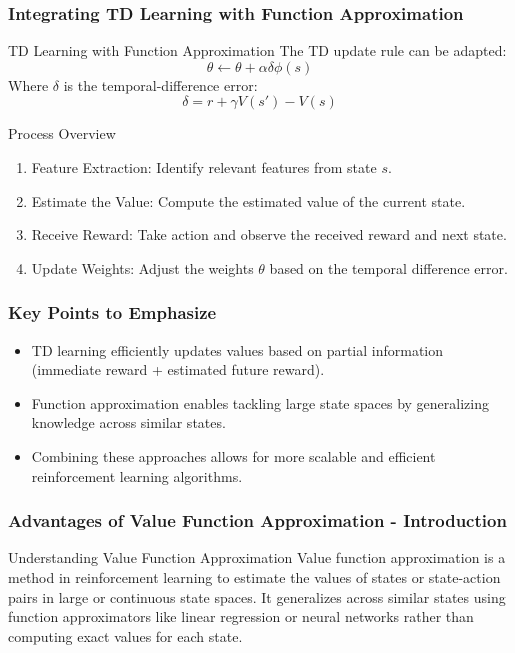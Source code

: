 \documentclass[aspectratio=169]{beamer}
\begin{document}
\begin{frame}[fragile]
    \frametitle{Integrating TD Learning with Function Approximation}
    
    \begin{block}{TD Learning with Function Approximation}
        The TD update rule can be adapted:
        \begin{equation}
            \theta \leftarrow \theta + \alpha \delta \phi(s)
        \end{equation}
        Where $\delta$ is the temporal-difference error:
        \begin{equation}
            \delta = r + \gamma V(s') - V(s)
        \end{equation}
    \end{block}
    
    \begin{block}{Process Overview}
        \begin{enumerate}
            \item Feature Extraction: Identify relevant features from state $s$.
            \item Estimate the Value: Compute the estimated value of the current state.
            \item Receive Reward: Take action and observe the received reward and next state.
            \item Update Weights: Adjust the weights $\theta$ based on the temporal difference error.
        \end{enumerate}
    \end{block}
\end{frame}

\begin{frame}[fragile]
    \frametitle{Key Points to Emphasize}
    \begin{itemize}
        \item TD learning efficiently updates values based on partial information (immediate reward + estimated future reward).
        \item Function approximation enables tackling large state spaces by generalizing knowledge across similar states.
        \item Combining these approaches allows for more scalable and efficient reinforcement learning algorithms.
    \end{itemize}
\end{frame}

\begin{frame}[fragile]
    \frametitle{Advantages of Value Function Approximation - Introduction}
    \begin{block}{Understanding Value Function Approximation}
        Value function approximation is a method in reinforcement learning to estimate the values of states or state-action pairs in large or continuous state spaces. It generalizes across similar states using function approximators like linear regression or neural networks rather than computing exact values for each state.
    \end{block}
\end{frame}
\end{document}
